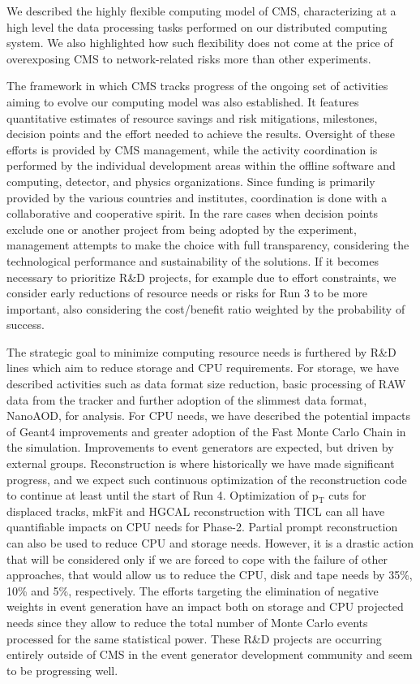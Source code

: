\documentclass{cmspaper}
\begin{document}
We described the highly flexible computing model of CMS, characterizing at a high level the data processing tasks performed on our distributed computing system. We also highlighted how such flexibility does not come at the price of overexposing CMS to network-related risks more than other experiments.

The framework in which CMS tracks progress of the ongoing set of activities aiming to evolve our computing model was also established. It features quantitative estimates of resource savings and risk mitigations, milestones, decision points and the effort needed to achieve the results.
Oversight of these efforts is provided by CMS management, while the activity coordination is performed by the individual development areas within the offline software and computing, detector, and physics organizations. Since funding is primarily provided by the various countries and institutes, coordination is done with a collaborative and cooperative spirit.
In the rare cases when decision points exclude one or another project from being adopted by the experiment, management attempts to make the choice with full transparency, considering the technological performance and sustainability of the solutions.
If it becomes necessary to prioritize R\&D projects, for example due to effort constraints, we consider early reductions of resource needs or risks for Run 3 to be more important, also considering the cost/benefit ratio weighted by the probability of success.

The strategic goal to minimize computing resource needs is furthered by R\&D lines which aim to reduce storage and CPU requirements. For storage, we have described activities such as data format size reduction, basic processing of RAW data from the tracker and further adoption of the slimmest data format, NanoAOD, for analysis. 
For CPU needs, we have described the potential impacts of Geant4 improvements and greater adoption of the Fast Monte Carlo Chain in the simulation. Improvements to event generators are expected, but driven by external groups. Reconstruction is where historically we have made significant progress, and we expect such continuous optimization of the reconstruction code to continue at least until the start of Run 4. Optimization of p$_\mathrm{T}$ cuts for displaced tracks, mkFit and HGCAL reconstruction with TICL can all have quantifiable impacts on CPU needs for Phase-2. Partial prompt reconstruction can also be used to reduce CPU and storage needs. However, it is a drastic action that will be considered only if we are forced to cope with the failure of other approaches, that would allow us to reduce the CPU, disk and tape needs by 35\%, 10\% and 5\%, respectively.
The efforts targeting the elimination of negative weights in event generation have an impact both on storage and CPU projected needs since they allow to reduce the total number of Monte Carlo events processed for the same statistical power. These R\&D projects are occurring entirely outside of CMS in the event generator development community and seem to be progressing well.
\end{document}
